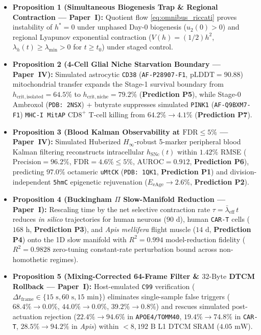\documentclass[11pt]{article}
\begin{document}
\begin{itemize}
  \item \textbf{Proposition 1 (Simultaneous Biogenesis Trap \& Regional Contraction --- Paper~I):} Quotient flow \eqref{eq:omnibus_riccati} proves instability of $h^*=0$ under unphased Day-0 biogenesis ($u_2(0)>0$) and regional Lyapunov exponential contraction ($V(h) = (1/2)h^2$, $\lambda_h(t) \ge \lambda_{\min} > 0$ for $t \ge t_0$) under staged control.
  \item \textbf{Proposition 2 (4-Cell Glial Niche Starvation Boundary --- Paper~IV):} Simulated astrocytic \texttt{CD38} (\texttt{AF-P28907-F1}, $\mathrm{pLDDT}=90.88$) mitochondrial transfer expands the Stage-1 survival boundary from $h_{\mathrm{crit,isolated}} = 64.5\%$ to $h_{\mathrm{crit,niche}} = 79.2\%$ (\textbf{Prediction P5}), while Stage-0 Ambroxol (\texttt{PDB: 2NSX}) + butyrate suppresses simulated \texttt{PINK1} (\texttt{AF-Q9BXM7-F1}) \texttt{MHC-I MitAP} $\mathrm{CD8}^+$ T-cell killing from $64.2\% \to 4.1\%$ (\textbf{Prediction P7}).
  \item \textbf{Proposition 3 (Blood Kalman Observability at $\mathrm{FDR} \le 5\%$ --- Paper~IV):} Simulated Huberized $H_\infty$-robust 5-marker peripheral blood Kalman filtering reconstructs intracellular $h_{\mathrm{SNc}}(t)$ within $1.42\%$ RMSE ($\mathrm{Precision}=96.2\%$, $\mathrm{FDR}=4.6\% \le 5\%$, $\mathrm{AUROC}=0.912$, \textbf{Prediction P6}), predicting $97.0\%$ octameric \texttt{uMtCK} (\texttt{PDB: 1QK1}, \textbf{Prediction P1}) and division-independent \texttt{5hmC} epigenetic rejuvenation ($E_{\mathrm{eAge}} \to 2.6\%$, \textbf{Prediction P2}).
  \item \textbf{Proposition 4 (Buckingham $\Pi$ Slow-Manifold Reduction --- Paper~I):} Rescaling time by the net selective contraction rate $\tau = \bar{\lambda}_{\mathrm{eff}}\,t$ reduces \textit{in silico} trajectories for human neurons ($90\text{ d}$), human \texttt{CAR-T} cells ($168\text{ h}$, \textbf{Prediction P3}), and \textit{Apis mellifera} flight muscle ($14\text{ d}$, \textbf{Prediction P4}) onto the 1D slow manifold with $R^2 = 0.994$ model-reduction fidelity ($R^2 = 0.9828$ zero-tuning constant-rate perturbation bound across non-homothetic regimes).
  \item \textbf{Proposition 5 (Mixing-Corrected 64-Frame Filter \& $32\text{-Byte}$ DTCM Rollback --- Paper~I):} Host-emulated \texttt{C99} verification ($\Delta t_{\mathrm{frame}} \in \{15\text{ s}, 60\text{ s}, 15\text{ min}\}$) eliminates single-sample false triggers ($68.4\% \to 0.0\%$, $44.0\% \to 0.0\%$, $39.2\% \to 0.8\%$) and rescues simulated post-actuation rejection ($22.4\% \to 94.6\%$ in \texttt{APOE4/TOMM40}, $19.4\% \to 74.8\%$ in \texttt{CAR-T}, $28.5\% \to 94.2\%$ in \textit{Apis}) within $< 8{,}192\text{ B}$ L1 DTCM SRAM ($4.05\text{ mW}$).
\end{itemize}
\end{document}
